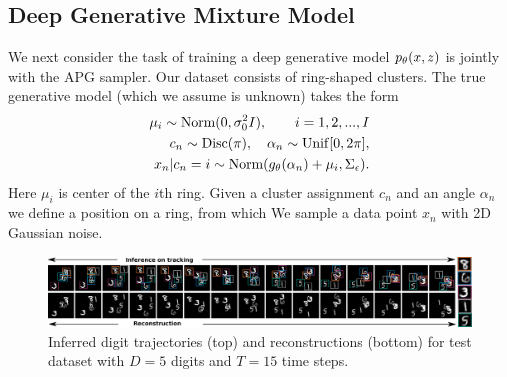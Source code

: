 \documentclass{article}
\theoremstyle{definition}
\begin{document}
\subsection{Deep Generative Mixture Model}
We next consider the task of training a deep generative model $p_\theta(x, z)$ is jointly with the APG sampler. Our dataset consists of ring-shaped clusters. The true generative model (which we assume is unknown) takes the form
\begin{align*}
    \mu_i \sim \text{Norm}(0, 
    \sigma_0^2 I), 
    \qquad i = 1, 2, ..., I \\
    c_n \sim \mathrm{Disc}(\pi), \quad \alpha_n \sim \mathrm{Unif}[0, 2\pi], \\
    x_n | c_n=i \sim \text{Norm}(g_\theta(\alpha_n) + \mu_i, \Sigma_\epsilon).
\end{align*}
Here $\mu_i$ is center of the $i$th ring. Given a cluster assignment $c_n$ and an angle $\alpha_n$ we define a position on a ring, from which We sample a data point $x_n$ with 2D Gaussian noise.


\begin{figure}[!h]
  \centering
  \includegraphics[width=1.0\textwidth]{figures/bmnist-5digits-samples.pdf}
  \caption{Inferred digit trajectories (top) and reconstructions (bottom) for test dataset with $D = 5$ digits and $T = 15$ time steps.}
  \label{mnist-qualitative}
\end{figure}
\end{document}
